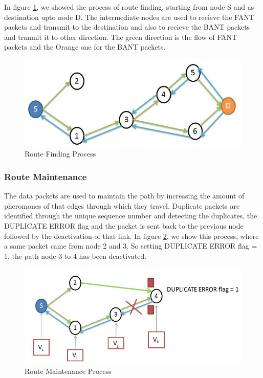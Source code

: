 In figure \ref{rfp}, we showed the process of route finding, starting from node S and as destination upto node D. The intermediate nodes are used to recieve the FANT packets and transmit to the destination and also to recieve the BANT packets and tranmit it to other direction. The green direction is the flow of FANT packets and the Orange one for the BANT packets.
\begin{figure}
    \centering
    \includegraphics[scale=0.6]{fantbant}
    \caption{Route Finding Process}
    \label{rfp}
\end{figure}

\subsubsection{Route Maintenance}
The data packets are used to maintain the path by increasing the amount of pheromones of that edges through which they travel. Duplicate packets are identified through the unique sequence number and detecting the duplicates, the DUPLICATE ERROR flag and the packet is sent back to the previous node followed by the deactivation of that link. In figure \ref{duperr}, we show this process, where a same packet came from node 2 and 3. So setting DUPLICATE ERROR flag = 1, the path node 3 to 4 has been deactivated.

\begin{figure}
    \centering
    \includegraphics[scale=0.6]{duperr}
    \caption{Route Maintenance Process}
    \label{duperr}
\end{figure}


